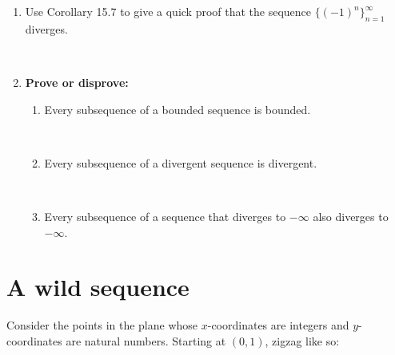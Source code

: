 \documentclass[12pt]{amsart}
\begin{document}
\begin{enumerate}
\

\item Use Corollary 15.7 to give a quick proof that the sequence $\{ (-1)^n \}_{n=1}^\infty$ diverges.

\

\item \textbf{Prove or disprove:}
\begin{enumerate}


\item Every subsequence of a bounded sequence is bounded.

\

\item Every subsequence of a divergent sequence is divergent.

\

\item Every subsequence of a sequence that diverges to $-\infty$ also diverges to $-\infty$.
\end{enumerate}
\end{enumerate}

\newpage

\section*{A wild sequence}

Consider the points in the plane whose $x$-coordinates are integers and $y$-coordinates are natural numbers. Starting at $(0,1)$, zigzag like so:
	
\end{document}
